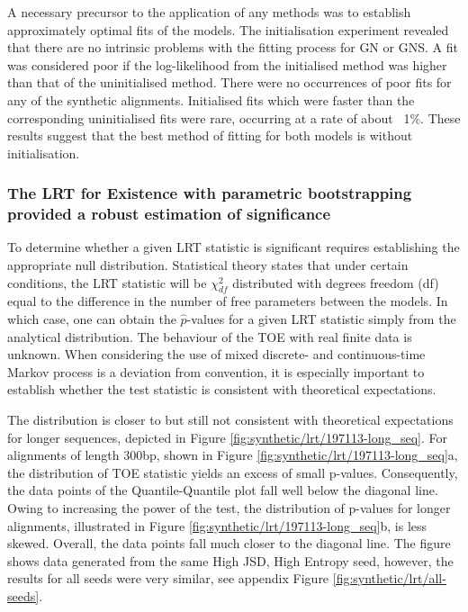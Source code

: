 A necessary precursor to the application of any methods was to establish approximately optimal fits of the models. The initialisation experiment revealed that there are no intrinsic problems with the fitting process for GN or GNS. A fit was considered poor if the log-likelihood from the initialised method was higher than that of the uninitialised method. There were no occurrences of poor fits for any of the synthetic alignments. Initialised fits which were faster than the corresponding uninitialised fits were rare, occurring at a rate of about ~1\%. These results suggest that the best method of fitting for both models is without initialisation.

\subsubsection*{The LRT for Existence with parametric bootstrapping provided a robust estimation of significance}

To determine whether a given LRT statistic is significant requires establishing the appropriate null distribution. Statistical theory states that under certain conditions, the LRT statistic will be $\chi^2_{df}$ distributed with degrees freedom (df) equal to the difference in the number of free parameters between the models. In which case, one can obtain the $\hat p$-values for a given LRT statistic simply from the analytical distribution. The behaviour of the TOE with real finite data is unknown. When considering the use of mixed discrete- and continuous-time Markov process is a deviation from convention, it is especially important to establish whether the test statistic is consistent with theoretical expectations. 

The distribution is closer to but still not consistent with theoretical expectations for longer sequences, depicted in Figure \ref{fig:synthetic/lrt/197113-long_seq}. For alignments of length 300bp, shown in Figure \ref{fig:synthetic/lrt/197113-long_seq}a, the distribution of TOE statistic yields an excess of small p-values. Consequently, the data points of the Quantile-Quantile plot fall well below the diagonal line. Owing to increasing the power of the test, the distribution of p-values for longer alignments, illustrated in Figure \ref{fig:synthetic/lrt/197113-long_seq}b, is less skewed. Overall, the data points fall much closer to the diagonal line. The figure shows data generated from the same High JSD, High Entropy seed, however, the results for all seeds were very similar, see appendix Figure \ref{fig:synthetic/lrt/all-seeds}. 

